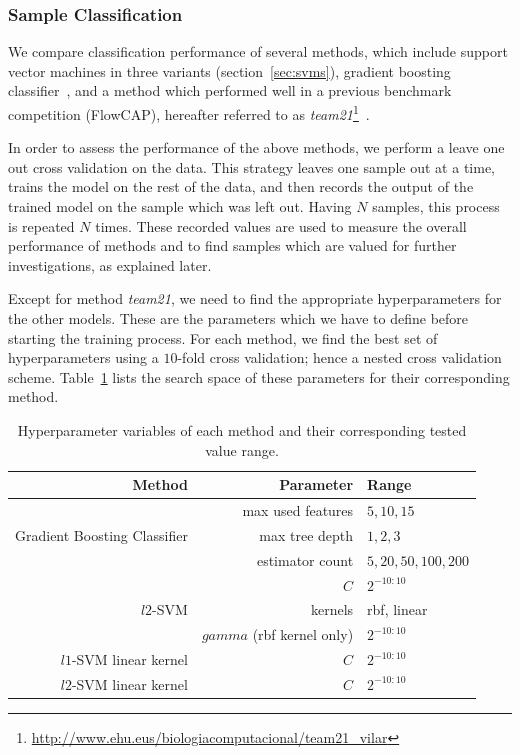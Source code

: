 \subsubsection{Sample Classification}
We compare classification performance of several methods, which include support vector machines in three variants (section~\ref{sec:svms}), gradient boosting classifier~\cite{friedman2002stochastic}, and a method which performed well in a previous benchmark competition (FlowCAP), hereafter referred to as \emph{team21}\footnote{\url{http://www.ehu.eus/biologiacomputacional/team21_vilar}}~\cite{Aghaeepour2013Critical}. 

In order to assess the performance of the above methods, we perform a leave one out cross validation on the data. This strategy leaves one sample out at a time, trains the model on the rest of the data, and then records the output of the trained model on the sample which was left out. Having $N$ samples, this process is repeated $N$ times. These recorded values are used to measure the overall performance of methods and to find samples which are valued for further investigations, as explained later.

Except for method \emph{team21}, we need to find the appropriate hyperparameters for the other models. These are the parameters which we have to define before starting the training process. For each method, we find the best set of hyperparameters using a $10$-fold cross validation; hence a nested cross 
validation scheme. Table~\ref{tbl:fcs-qa:hyperparameters} lists the search space of these parameters for their corresponding method.

\begin{table}[!ht]
  \centering
  \begin{tabular}{rrl}
    Method & Parameter & Range \\ \hline \rule{0pt}{2.4ex}
    & max used features & ${5, 10, 15}$  \\
    Gradient Boosting Classifier & max tree depth & ${1, 2, 3}$ \\
    & estimator count & ${5, 20, 50, 100, 200}$ \\ \hline \rule{0pt}{2.4ex}
    & $C$ & $2^{-10:10}$ \\
    $l2$-SVM & kernels & rbf, linear \\
	& $gamma$ (rbf kernel only) & $2^{-10:10}$ \\ \hline \rule{0pt}{2.4ex}
    $l1$-SVM linear kernel & $C$ & $2^{-10:10}$ \\ \hline \rule{0pt}{2.4ex}
    $l2$-SVM linear kernel & $C$ & $2^{-10:10}$ \\
  \end{tabular}
  \caption{Hyperparameter variables of each method and their corresponding tested value range.}
  \label{tbl:fcs-qa:hyperparameters}
\end{table}


